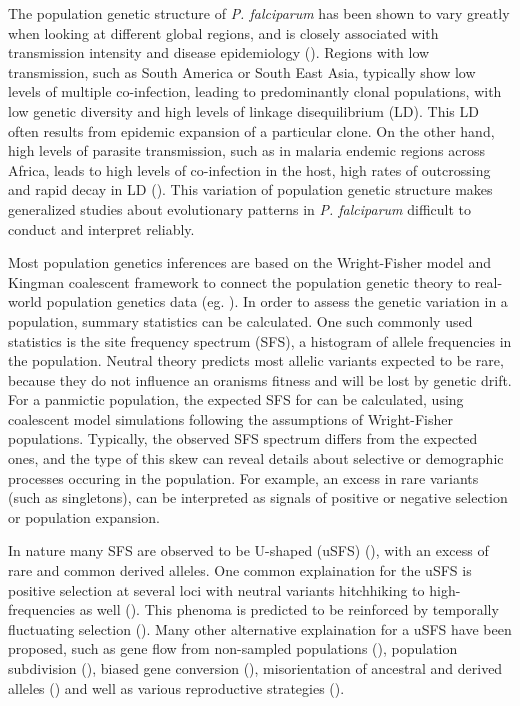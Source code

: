 \documentclass[11pt]{article}
\begin{document}
The population genetic structure of \emph{P. falciparum} has been shown to vary greatly when looking at different global regions, and is closely associated with transmission intensity and disease epidemiology (\cite{anderson-2000-micros-marker}). Regions with low transmission, such as South America or South East Asia, typically show low levels of multiple co-infection, leading to predominantly clonal populations, with low genetic diversity and high levels of linkage disequilibrium (LD). This LD often results from epidemic expansion of a particular clone. On the other hand, high levels of parasite transmission, such as in malaria endemic regions across Africa, leads to high levels of co-infection in the host, high rates of outcrossing and rapid decay in LD (\cite{mu-2005-recom-hotsp}). This variation of population genetic structure makes generalized studies about evolutionary patterns in \emph{P. falciparum} difficult to conduct and interpret reliably.

Most population genetics inferences are based on the Wright-Fisher model and Kingman coalescent framework to connect the population genetic theory to real-world population genetics data (eg. \cite{li-2013-coales-tree}). In order to assess the genetic variation in a population, summary statistics can be calculated. One such commonly used statistics is the site frequency spectrum (SFS), a histogram of allele frequencies in the population. Neutral theory predicts most allelic variants expected to be rare, because they do not influence an oranisms fitness and will be lost by genetic drift. For a panmictic population, the expected SFS for can be calculated, using coalescent model simulations following the assumptions of Wright-Fisher populations. Typically, the observed SFS spectrum differs from the expected ones, and the type of this skew can reveal details about selective or demographic processes occuring in the population. For example, an excess in rare variants (such as singletons), can be interpreted as signals of positive or negative selection or population expansion.

In nature many SFS are observed to be U-shaped (uSFS) (\cite{freund-2023-inter-pervas}), with an excess of rare and common derived alleles. One common explaination for the uSFS is positive selection at several loci with neutral variants hitchhiking to high-frequencies as well (\cite{bustamante-2001-direc-selec}). This phenoma is predicted to be reinforced by temporally fluctuating selection (\cite{huerta-sanchez-2008-popul-genet}). Many other alternative explaination for a uSFS have been proposed, such as gene flow from non-sampled populations (\cite{marchi-2020-gene-flow}), population subdivision (\cite{lapierre-2016-impac-selec}), biased gene conversion (\cite{pouyet-2018-backg-selec}), misorientation of ancestral and derived alleles (\cite{baudry-2003-effec-misor}) and well as various reproductive strategies (\cite{tellier-2014-coales}).
\end{document}
